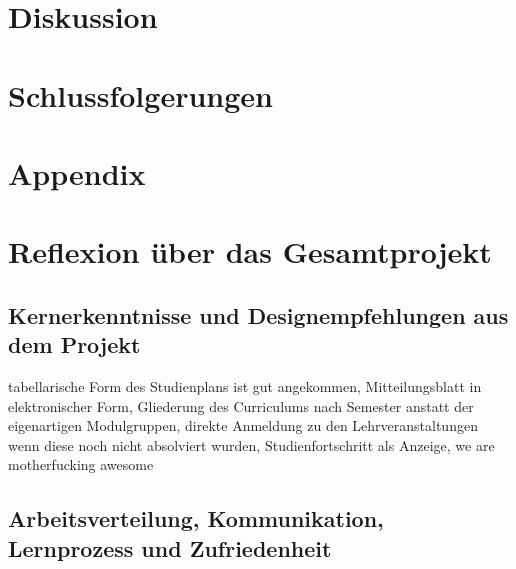 \documentclass[a4paper,10pt]{scrartcl}
\begin{document}
\section{Diskussion}


\section{Schlussfolgerungen}


\section{Appendix}

\section{Reflexion über das Gesamtprojekt}

\subsection{Kernerkenntnisse und Designempfehlungen aus dem Projekt}

% 

tabellarische Form des Studienplans ist gut angekommen, Mitteilungsblatt in elektronischer Form, Gliederung des Curriculums nach Semester anstatt der eigenartigen
Modulgruppen, direkte Anmeldung zu den Lehrveranstaltungen wenn diese noch nicht absolviert wurden, Studienfortschritt als Anzeige, we are motherfucking awesome

\subsection{Arbeitsverteilung, Kommunikation, Lernprozess und Zufriedenheit}


\end{document}
